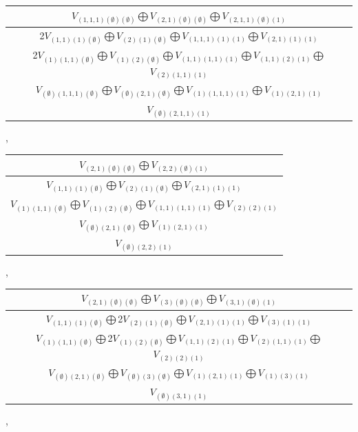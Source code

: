 \documentclass[letterpaper,11pt]{article}
\begin{document}
	\begin{tabular}{| c |}
		\hline
		$V_{(1,1,1)(\emptyset)(\emptyset)}$$\bigoplus$$V_{(2,1)(\emptyset)(\emptyset)}$$\bigoplus$$V_{(2,1,1)(\emptyset)(1)}$\\
		\hline
		2$V_{(1,1)(1)(\emptyset)}$$\bigoplus$$V_{(2)(1)(\emptyset)}$$\bigoplus$$V_{(1,1,1)(1)(1)}$$\bigoplus$$V_{(2,1)(1)(1)}$\\
		\hline
		2$V_{(1)(1,1)(\emptyset)}$$\bigoplus$$V_{(1)(2)(\emptyset)}$$\bigoplus$$V_{(1,1)(1,1)(1)}$$\bigoplus$$V_{(1,1)(2)(1)}$$\bigoplus$$V_{(2)(1,1)(1)}$\\
		\hline
		$V_{(\emptyset)(1,1,1)(\emptyset)}$$\bigoplus$$V_{(\emptyset)(2,1)(\emptyset)}$$\bigoplus$$V_{(1)(1,1,1)(1)}$$\bigoplus$$V_{(1)(2,1)(1)}$\\
		\hline
		$V_{(\emptyset)(2,1,1)(1)}$\\
		\hline
	\end{tabular}, 
	\newline 
	\begin{tabular}{| c |}
		\hline
		$V_{(2,1)(\emptyset)(\emptyset)}$$\bigoplus$$V_{(2,2)(\emptyset)(1)}$\\
		\hline
		$V_{(1,1)(1)(\emptyset)}$$\bigoplus$$V_{(2)(1)(\emptyset)}$$\bigoplus$$V_{(2,1)(1)(1)}$\\
		\hline
		$V_{(1)(1,1)(\emptyset)}$$\bigoplus$$V_{(1)(2)(\emptyset)}$$\bigoplus$$V_{(1,1)(1,1)(1)}$$\bigoplus$$V_{(2)(2)(1)}$\\
		\hline
		$V_{(\emptyset)(2,1)(\emptyset)}$$\bigoplus$$V_{(1)(2,1)(1)}$\\
		\hline
		$V_{(\emptyset)(2,2)(1)}$\\
		\hline
	\end{tabular}, 
	\newline 
	\begin{tabular}{| c |}
		\hline
		$V_{(2,1)(\emptyset)(\emptyset)}$$\bigoplus$$V_{(3)(\emptyset)(\emptyset)}$$\bigoplus$$V_{(3,1)(\emptyset)(1)}$\\
		\hline
		$V_{(1,1)(1)(\emptyset)}$$\bigoplus$2$V_{(2)(1)(\emptyset)}$$\bigoplus$$V_{(2,1)(1)(1)}$$\bigoplus$$V_{(3)(1)(1)}$\\
		\hline
		$V_{(1)(1,1)(\emptyset)}$$\bigoplus$2$V_{(1)(2)(\emptyset)}$$\bigoplus$$V_{(1,1)(2)(1)}$$\bigoplus$$V_{(2)(1,1)(1)}$$\bigoplus$$V_{(2)(2)(1)}$\\
		\hline
		$V_{(\emptyset)(2,1)(\emptyset)}$$\bigoplus$$V_{(\emptyset)(3)(\emptyset)}$$\bigoplus$$V_{(1)(2,1)(1)}$$\bigoplus$$V_{(1)(3)(1)}$\\
		\hline
		$V_{(\emptyset)(3,1)(1)}$\\
		\hline
	\end{tabular}, 
\end{document}
